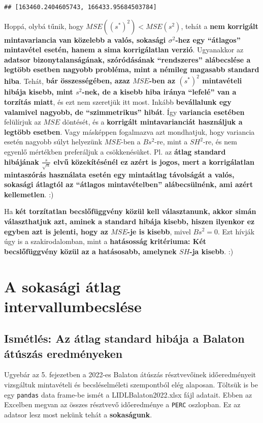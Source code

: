 \documentclass[
]{book}
\begin{document}
\begin{verbatim}
## [163460.2404605743, 166433.95684503784]
\end{verbatim}

Hoppá, olybá tűnik, hogy \(MSE((s^*)^2) < MSE(s^2)\), tehát a \textbf{nem korrigált mintavariancia van közelebb a valós, sokasági \(\sigma^2\)-hez egy ``átlagos'' mintavétel esetén, hanem a sima korrigálatlan verzió}.
Ugyanakkor az \textbf{adatsor bizonytalanságának, szóródásának ``rendszeres'' alábecslése a legtöbb esetben nagyobb probléma, mint a némileg magasabb standard hiba}. Tehát, \textbf{bár összességében, azaz \(MSE\)-ben az \((s^*)^2\) mintavételi hibája kisebb, mint \(s^2\)-nek, de a kisebb hiba iránya ``lefelé'' van a torzítás miatt}, és ezt nem szeretjük itt most. Inkább \textbf{bevállalunk egy valamivel nagyobb, de ``szimmetrikus'' hibát}.
Így \textbf{variancia esetében} felülírjuk az \(MSE\) döntését, és a \textbf{korrigált mintavarianciát használjuk a legtöbb esetben}. Vagy másképpen fogalmazva azt mondhatjuk, hogy variancia esetén nagyobb súlyt helyezünk \(MSE\)-ben a \(Bs^2\)-re, mint a \(SH^2\)-re, és nem egyenlő mértékben preferáljuk a csökkenésüket.
Pl. az \textbf{átlag standard hibájának \(\frac{s}{\sqrt{n}}\) elvű közekítésénél ez azért is jogos, mert a korrigálatlan mintaszórás használata esetén egy mintaátlag távolságát a valós, sokasági átlagtól az ``átlagos mintavételben'' alábecsülnénk, ami azért kellemetlen}. :)

Ha \textbf{két torzítatlan becslőfüggvény közül kell választanunk, akkor simán választhatjuk azt, aminek a standard hibája kisebb, hiszen ilyenkor ez egyben azt is jelenti, hogy az \(MSE\)-je is kisebb}, mivel \(Bs^2=0\). Ezt hívják úgy is a szakirodalomban, mint a \textbf{hatásosság kritériuma: Két becslőfüggvény közül az a hatásosabb, amelynek \(SH\)-ja kisebb}. :)

\chapter{A sokasági átlag intervallumbecslése}\label{a-sokasuxe1gi-uxe1tlag-intervallumbecsluxe9se}

\section{Ismétlés: Az átlag standard hibája a Balaton átúszás eredményeken}\label{ismuxe9tluxe9s-az-uxe1tlag-standard-hibuxe1ja-a-balaton-uxe1tuxfaszuxe1s-eredmuxe9nyeken}

Ugyebár az 5. fejezetben a 2022-es Balaton átúszás résztvevőinek időeredményeit vizsgáltuk mintavételi és becsléselméleti szempontból elég alaposan. Töltsük is be egy \texttt{pandas} data frame-be ismét a LIDLBalaton2022.xlsx fájl adatait. Ebben az Excelben megvan az összes résztvevő időeredménye a \texttt{PERC} oszlopban. Ez az adatsor lesz most nekünk tehát a \textbf{sokaságunk}.
\end{document}
